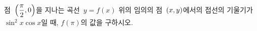 \hspace*{2mm}\begin{minipage}[t]{\dimexpr\linewidth-2mm\relax}\vspace{0pt}
점~$\left(\dfrac{\pi}{2}{,}\mkern3mu\mathopen{}0\right)$을 지나는 곡선~$y=f(x)$ 위의 임의의 점~$(x{,}\mkern3mu\mathopen{}y)$에서의 접선의 기울기가 $\sin^2 x\cos x$일 때, $f(\pi)$의 값을 구하시오.\end{minipage}
